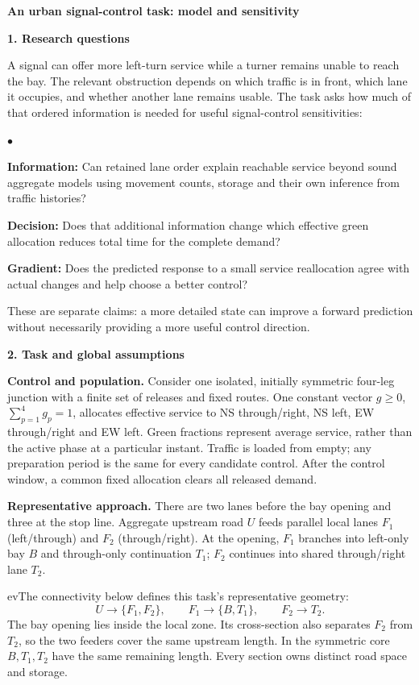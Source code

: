 \documentclass[10pt,a4paper]{article}
\newcommand{\head}[1]{\par\vspace{4pt}\noindent\textbf{#1}\par\nobreak\vspace{1pt}}
\newenvironment{points}{\begin{list}{$\bullet$}{%
 \setlength{\leftmargin}{1.4em}\setlength{\labelwidth}{0.7em}%
 \setlength{\labelsep}{0.4em}\setlength{\itemsep}{2pt}%
 \setlength{\parsep}{0pt}\setlength{\topsep}{3pt}}}{\end{list}}
\begin{document}
\begin{center}
{\large\bfseries An urban signal-control task: model and sensitivity}
\end{center}
\vspace{-5pt}

\head{1. Research questions}
A signal can offer more left-turn service while a turner remains unable
to reach the bay. The relevant obstruction depends on which traffic is
in front, which lane it occupies, and whether another lane remains usable.
The task asks how much of that ordered information is needed for useful
signal-control sensitivities:
\begin{points}
\item \textbf{Information:} Can retained lane order explain reachable
service beyond sound aggregate models using movement counts, storage
and their own inference from traffic histories?
\item \textbf{Decision:} Does that additional information change which
effective green allocation reduces total time for the complete demand?
\item \textbf{Gradient:} Does the predicted response to a small service
reallocation agree with actual changes and help choose a better control?
\end{points}
These are separate claims: a more detailed state can improve a forward
prediction without necessarily providing a more useful control direction.

\head{2. Task and global assumptions}
\textbf{Control and population.} Consider one isolated, initially symmetric
four-leg junction with a finite set of releases and fixed routes.
One constant vector $g\geq0$, $\sum_{p=1}^4g_p=1$, allocates effective
service to NS through/right, NS left, EW through/right and EW left.
Green fractions represent average service, rather than the active phase
at a particular instant. Traffic is loaded from empty; any preparation
period is the same for every candidate control. After the control window,
a common fixed allocation clears all released demand.

\textbf{Representative approach.} There are two lanes before the bay
opening and three at the stop line. Aggregate upstream road $U$ feeds
parallel local lanes $F_1$ (left/through) and $F_2$ (through/right).
At the opening, $F_1$ branches into left-only bay $B$ and through-only
continuation $T_1$; $F_2$ continues into shared through/right lane $T_2$.

ev{The connectivity below defines this task's representative geometry:}
\[
 U\longrightarrow\{F_1,F_2\},\qquad
 F_1\longrightarrow\{B,T_1\},\qquad F_2\longrightarrow T_2.
\]
The bay opening lies inside the local zone. Its cross-section also
separates $F_2$ from $T_2$, so the two feeders cover the same upstream
length. In the symmetric core $B,T_1,T_2$ have the same remaining length.
Every section owns distinct road space and storage.
\end{document}
